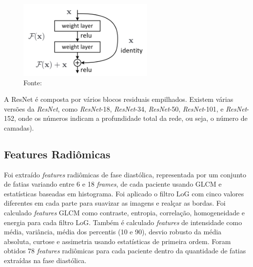 \begin{figure}[htbp]
    \centering
    \includegraphics[width=0.6\textwidth]{figures/fig013.png}
    \caption{Fonte: \cite{aiSelfAttentionBasedFusion2023}}
    \label{fig:fig013}
\end{figure}

A ResNet é composta por vários blocos residuais empilhados.
Existem várias versões da \textit{ResNet}, como \textit{ResNet}-18, \textit{ResNet}-34, \textit{ResNet}-50, \textit{ResNet}-101, e \textit{ResNet}-152, onde os números indicam a profundidade total da rede, ou seja, o número de camadas).

\subsection{Features Radiômicas}
\label{subsec:cap4_features_radiomicas}

Foi extraído \textit{features} radiômicas de fase diastólica, representada por um conjunto de fatias variando entre 6 e 18 \textit{frames}, de cada paciente usando \gls{GLCM} e estatísticas baseadas em histograma. Foi aplicado o filtro \gls{LoG} com cinco valores diferentes em cada parte para suavizar as imagens e realçar as bordas. Foi calculado \textit{features} \gls{GLCM} como contraste, entropia, correlação, homogeneidade e energia para cada filtro \gls{LoG}. Também é calculado \textit{features} de intensidade como média, variância, média dos percentis (10 e 90), desvio robusto da média absoluta, curtose e assimetria usando estatísticas de primeira ordem. Foram obtidos 78 \textit{features} radiômicas para cada paciente dentro da quantidade de fatias extraídas na fase diastólica.

